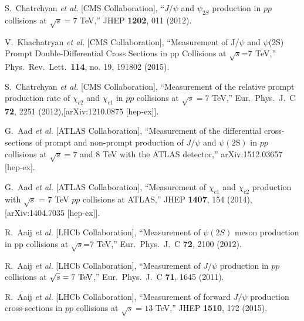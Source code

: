 \documentclass[12pt,a4paper,final]{iopart}
\begin{document}
\begin{thebibliography}{100}
  S.~Chatrchyan {\it et al.} [CMS Collaboration],
  ``$J/\psi$ and $\psi_{2S}$ production in $pp$ collisions at $\sqrt{s}=7$ TeV,''
  JHEP {\bf 1202}, 011 (2012).
  

  V.~Khachatryan {\it et al.} [CMS Collaboration],
  ``Measurement of J/$\psi$ and $\psi$(2S) Prompt Double-Differential Cross Sections in pp Collisions at $\sqrt{s}$=7  TeV,''
  Phys.\ Rev.\ Lett.\  {\bf 114}, no. 19, 191802 (2015).

  S.~Chatrchyan {\it et al.} [CMS Collaboration],
  ``Measurement of the relative prompt production rate of $\chi_{c2}$ and $\chi_{c1}$ 
  in $pp$ collisions at $\sqrt{s}=7$ TeV,''
  Eur.\ Phys.\ J.\ C {\bf 72}, 2251 (2012),[arXiv:1210.0875 [hep-ex]].


  G.~Aad {\it et al.} [ATLAS Collaboration],
  ``Measurement of the differential cross-sections of prompt and non-prompt production of $J/\psi$ 
  and $\psi(2\mathrm{S})$ in $pp$ collisions at $\sqrt{s} = 7$ and $8$ TeV with the ATLAS detector,''
  arXiv:1512.03657 [hep-ex].


  G.~Aad {\it et al.} [ATLAS Collaboration],
  ``Measurement of $\chi_{c1}$ and $\chi_{c2}$ production with $\sqrt{s}$ = 7 TeV $pp$ collisions at ATLAS,''
  JHEP {\bf 1407}, 154 (2014), [arXiv:1404.7035 [hep-ex]].


  R.~Aaij {\it et al.} [LHCb Collaboration],
  ``Measurement of $\psi(2S)$ meson production in pp collisions at $\sqrt{s}$=7 TeV,''
  Eur.\ Phys.\ J.\ C {\bf 72}, 2100 (2012).


  R.~Aaij {\it et al.} [LHCb Collaboration],
  ``Measurement of $J/\psi$ production in $pp$ collisions at $\sqrt{s}=7~\rm{TeV}$,''
  Eur.\ Phys.\ J.\ C {\bf 71}, 1645 (2011).

  R.~Aaij {\it et al.} [LHCb Collaboration],
  ``Measurement of forward $J/\psi$ production cross-sections in $pp$ collisions at $\sqrt{s}=13$ TeV,''
  JHEP {\bf 1510}, 172 (2015).





\end{thebibliography}
\end{document}
